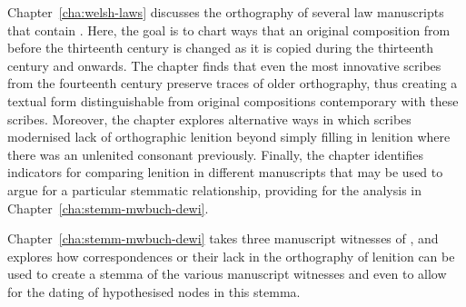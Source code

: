 Chapter~\ref{cha:welsh-laws} discusses the orthography of several law manuscripts that contain . Here, the goal is to chart ways that an original composition from before the  thirteenth century is changed as it is copied during the thirteenth century and onwards. The chapter finds that even the most innovative scribes from the fourteenth century preserve traces of older orthography, thus creating a textual form distinguishable from original compositions contemporary with these scribes. Moreover, the chapter explores  alternative ways in which scribes modernised lack of orthographic lenition beyond simply filling in lenition where there was an unlenited consonant previously. Finally, the chapter identifies indicators for comparing lenition in different manuscripts that may be used to argue for a particular stemmatic relationship, providing for the analysis in Chapter~\ref{cha:stemm-mwbuch-dewi}.

Chapter~\ref{cha:stemm-mwbuch-dewi} takes three manuscript witnesses of , and explores how correspondences or their lack in the orthography of lenition can be used to create a stemma of the various manuscript witnesses and even to allow for the dating of hypothesised nodes in this stemma. 


